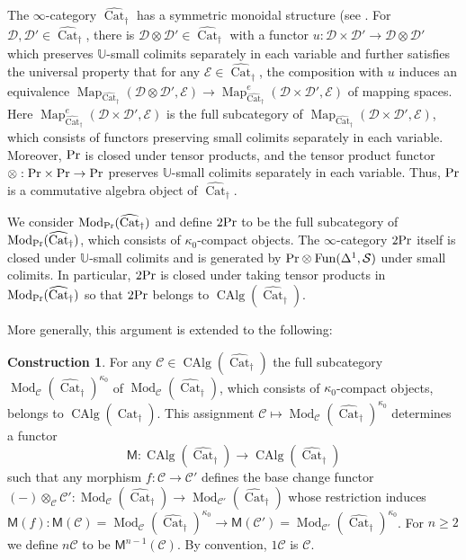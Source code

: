 \documentclass[leqno,12pt]{amsart}
\theoremstyle{plain}
\theoremstyle{definition}
\newtheorem{Construction}[Theorem]{Construction}
\newcommand{\DDD}{\mathcal{D}}
\newcommand{\CCC}{\mathcal{C}}
\newcommand{\PR}{\textup{Pr}}
\newcommand{\Mod}{\operatorname{Mod}}
\newcommand{\SSS}{\mathcal{S}}
\newcommand{\Map}{\operatorname{Map}}
\newcommand{\Fun}{\operatorname{Fun}}
\newcommand{\CAlg}{\operatorname{CAlg}}
\newcommand{\vCat}{\widehat{\operatorname{Cat}}_\dagger}
\newcommand{\UUUU}{\mathbb{U}}
\begin{document}
The $\infty$-category $\vCat$ has a symmetric monoidal structure (see \cite[4.8.1.3]{HA}.
For $\DDD,\DDD'\in \vCat$, there is $\DDD\otimes \DDD' \in \vCat$ with a functor $u:\DDD\times \DDD'\to \DDD\otimes \DDD'$
which preserves $\UUUU$-small colimits separately in each variable and further satisfies
the universal property that for any $\mathcal{E}\in \vCat$, the composition with $u$ induces
an equivalence $\Map_{\vCat}(\DDD\otimes \DDD',\mathcal{E})\to \Map_{\vCat}^e(\DDD\times \DDD',\mathcal{E})$
of mapping spaces. Here $\Map_{\vCat}^e(\DDD\times \DDD',\mathcal{E})$ is the full subcategory of $\Map_{\vCat}(\DDD\times \DDD',\mathcal{E})$,
which consists of functors preserving small colimits separately in each variable.
Moreover, $\PR$ is closed under tensor products,
and the tensor product functor 
$\otimes:\PR\times \PR\to \PR$ preserves $\UUUU$-small colimits separately in each  variable.
Thus, $\PR$ is a commutative algebra object of $\vCat$.


We consider $\Mod_{\PR}(\vCat)$ and define $2\PR$ to be the full subcategory of $\Mod_{\PR}(\vCat)$,
which consists of $\kappa_0$-compact objects.
The $\infty$-category $2\PR$ itself is closed under $\UUUU$-small colimits 
and is generated by $\PR\otimes \Fun(\Delta^1,\SSS)$ under small colimits.
In particular, $2\PR$ is closed under taking tensor products in $\Mod_{\PR}(\vCat)$
so that $2\PR$ belongs to $\CAlg(\vCat)$.

More generally, this argument is extended to the following:

\begin{Construction}
\label{constructionnc}
For any $\mathcal{\CCC}\in \CAlg(\vCat)$
the full subcategory $\Mod_{\CCC}(\vCat)^{\kappa_0}$ of $\Mod_{\CCC}(\vCat)$,
which consists of $\kappa_0$-compact objects, belongs to $\CAlg(\vCat)$.
This assignment $\CCC\mapsto \Mod_{\CCC}(\vCat)^{\kappa_0}$ determines a functor
\[
\mathsf{M}:\CAlg(\vCat)  \longrightarrow \CAlg(\vCat)
\]
such that any morphism $f:\mathcal{C}\to \mathcal{C}'$ defines the base change functor
$(-)\otimes_{\mathcal{C}}\mathcal{C}':\Mod_{\mathcal{C}}(\vCat)\to \Mod_{\mathcal{C}'}(\vCat)$ whose restriction 
induces $\mathsf{M}(f):\mathsf{M}(\mathcal{C})=\Mod_{\mathcal{C}}(\vCat)^{\kappa_0}\to \mathsf{M}(\mathcal{C}')=\Mod_{\mathcal{C}'}(\vCat)^{\kappa_0}$.
For $n\ge2$ we define $n\CCC$ to be $\mathsf{M}^{n-1}(\CCC)$. By convention, $1\CCC$ is $\CCC$.
\end{Construction}
\end{document}
